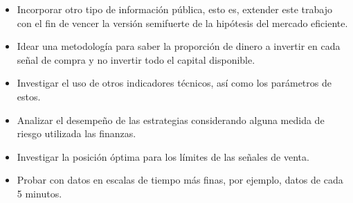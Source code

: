 \documentclass[12pt]{report}
\theoremstyle{break}
\theoremstyle{break}
\begin{document}
\begin{itemize}
\item Incorporar otro tipo de información pública, esto es, extender este trabajo con el fin de vencer la versión semifuerte de la hipótesis del mercado eficiente.

\item Idear una metodología para saber la proporción de dinero a invertir en cada señal de compra y no invertir todo el capital disponible.

\item Investigar el uso de otros indicadores técnicos, así como los parámetros de estos.

\item Analizar el desempeño de las estrategias considerando alguna medida de riesgo utilizada las finanzas.

\item Investigar la posición óptima para los límites de las señales de venta.

\item Probar con datos en escalas de tiempo más finas, por ejemplo, datos de cada 5 minutos.
\end{itemize}




\nocite{Preen2010}
\nocite{Kuo2013}
\nocite{Wang2014}
\nocite{Hu2015} %
\end{document}
